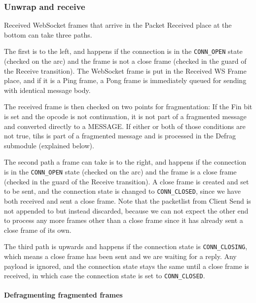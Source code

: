 	\subsubsection{Unwrap and receive}
		
		
		Received WebSocket frames that arrive in the Packet Received place at the
		bottom can take three paths. 
		
		The first is to the left, and happens if the
		connection is in the \lstinline:CONN_OPEN: state (checked on the arc) and the
		frame is not a close frame (checked in the guard of the Receive transition). The WebSocket
		frame is put in the Received WS Frame place, and if it is a Ping frame, a Pong
		frame is immediately queued for sending with identical message body. 
		
		The received frame is then checked on two points for fragmentation: If the Fin
		bit is set and the opcode is not continuation, it is not part of a fragmented
		message and converted directly to a MESSAGE. If either or both of those
		conditions are not true, tihs is part of a fragmented message and is processed
		in the Defrag submodule (explained below).
		
		The second path a frame can take is to the right, and happens if the
		connection is in the \lstinline:CONN_OPEN: state (checked on the arc) and the
		frame is a close frame (checked in the guard of the Receive transition). A
		close frame is created and set to be sent, and the
		connection state is changed to \lstinline:CONN_CLOSED:, since we have both
		received and sent a close frame. Note that the packetlist from Client Send is
		not appended to but instead discarded, because we can not expect the other
		end to process any more frames other than a close frame since it has already
		sent a close frame of its own.
		
		The third path is upwards and happens if the connection state is
		\lstinline:CONN_CLOSING:, which means a close frame has been sent and we are
		waiting for a reply. Any payload is ignored, and the connection state stays
		the same until a close frame is received, in which case the connection state
		is set to \lstinline:CONN_CLOSED:. 
		
		\paragraph{Defragmenting fragmented frames}
			
